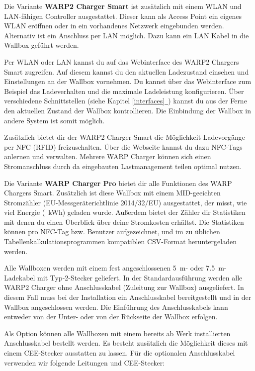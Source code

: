 \documentclass[a4paper,10pt]{article}
\newcommand*{\fullref}[1]{\hyperref[{#1}]{\ref*{#1}~\nameref*{#1}}}
\begin{document}
\begin{multicols*}{2}
	Die Variante \textbf{WARP2 Charger Smart} ist zusätzlich mit einem WLAN und
	LAN-fähigen Controller ausgestattet.
	Dieser kann als \nohyphens{Access} Point ein eigenes WLAN eröffnen oder in
	ein vorhandenes Netzwerk eingebunden werden. Alternativ ist ein Anschluss
	per LAN möglich. Dazu kann ein LAN Kabel in die Wallbox geführt werden.

	Per WLAN oder LAN kannst du auf das Webinterface des WARP2 Chargers Smart
	zugreifen. Auf diesem kannst du den aktuellen Ladezustand einsehen und
	Einstellungen an der Wallbox vornehmen. Du kannst über das Webinterface
	zum Beispiel das Ladeverhalten und die maximale Ladeleistung konfigurieren.
	Über verschiedene Schnittstellen (siehe Kapitel \fullref{interfaces}) kannst du aus der Ferne den aktuellen Zustand
	der Wallbox kontrollieren. Die Einbindung der Wallbox in andere System ist somit möglich.

	Zusätzlich bietet dir der WARP2 Charger Smart die Möglichkeit Ladevorgänge
	per NFC (RFID) freizuschalten. Über die Webseite kannst du dazu NFC-Tags
	anlernen und verwalten. Mehrere WARP Charger können sich einen
	Stromanschluss durch da eingebauten Lastmanagement teilen optimal nutzen.

	Die Variante \textbf{WARP Charger Pro} bietet dir alle Funktionen des WARP Chargers Smart.
	Zusätzlich ist diese Wallbox mit einem MID-geeichten Stromzähler (EU-Messgeräterichtlinie 2014/32/EU)
	ausgestattet, der misst, wie viel Energie (\SI{}{\kWh}) geladen
	wurde. Außerdem bietet der Zähler dir Statistiken mit denen du einen Überblick über deine
	Stromkosten erhältst. Die Statistiken können pro NFC-Tag bzw. Benutzer aufgezeichnet,
	und im zu üblichen Tabellenkalkulationsprogrammen kompatiblen CSV-Format
	heruntergeladen werden.

	Alle Wallboxen werden mit einem fest angeschlossenen
	\SI{5}{\meter}- oder \SI{7,5}{\meter}-Ladekabel mit Typ-2-Stecker geliefert.
	In der Standardausführung werden alle WARP2 Charger ohne Anschlusskabel
	(Zuleitung zur Wallbox) ausgeliefert. In diesem Fall muss bei der Installation
	ein Anschlusskabel bereitgestellt und in der Wallbox angeschlossen werden.
	Die Einführung des Anschlusskabels kann entweder von der Unter- oder von
	der Rückseite der Wallbox erfolgen.

	Als Option können alle Wallboxen mit einem bereits ab Werk
	installierten Anschlusskabel bestellt werden. Es besteht zusätzlich die
	Möglichkeit dieses mit einem CEE-Stecker ausstatten zu lassen.
	Für die optionalen Anschluss\-kabel verwenden wir folgende Leitungen und CEE-Stecker:


\end{multicols*}
\end{document}
